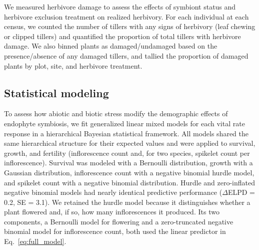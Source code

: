 \documentclass[12pt]{article}\usepackage[]{graphicx}\usepackage[dvipsnames]{xcolor}
\begin{document}
We measured herbivore damage to assess the effects of symbiont status and herbivore exclusion treatment on realized herbivory. 
For each individual at each census, we counted the number of tillers with any signs of herbivory (leaf chewing or clipped tillers) and quantified the proportion of total tillers with herbivore damage. 
We also binned plants as damaged/undamaged based on the presence/absence of any damaged tillers, and tallied the proportion of damaged plants by plot, site, and herbivore treatment.

\subsection*{Statistical modeling}
To assess how abiotic and biotic stress modify the demographic effects of endophyte symbiosis, we fit generalized linear mixed models for each vital rate response in a hierarchical Bayesian statistical framework. %
All models shared the same hierarchical structure for their expected values and were applied to survival, growth, and fertility (inflorescence count and, for two species, spikelet count per inflorescence).
Survival was modeled with a Bernoulli distribution, growth with a Gaussian distribution, inflorescence count with a negative binomial hurdle model, and spikelet count with a negative binomial distribution. 
Hurdle and zero-inflated negative binomial models had nearly identical predictive performance ($\Delta$ELPD = 0.2, SE = 3.1).
We retained the hurdle model because it distinguishes whether a plant flowered and, if so, how many inflorescences it produced. Its two components, a Bernoulli model for flowering and a zero-truncated negative binomial model for inflorescence count, both used the linear predictor in Eq.~\ref{eq:full_model}.
\end{document}
